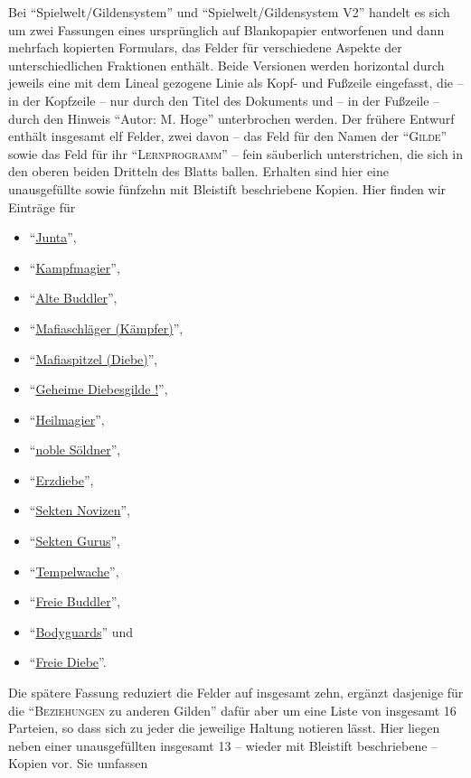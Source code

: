 \documentclass[a5paper,pagesize,numbers=noenddot]{scrbook}
\begin{document}
Bei \enquote{Spielwelt/Gildensystem} und \enquote{Spielwelt/Gildensystem V2} handelt es sich um zwei Fassungen eines ursprünglich auf Blankopapier entworfenen und dann mehrfach kopierten Formulars, das Felder für verschiedene Aspekte der unterschiedlichen Fraktionen enthält.
Beide Versionen werden horizontal durch jeweils eine mit dem Lineal gezogene Linie als Kopf- und Fußzeile eingefasst, die -- in der Kopfzeile -- nur durch den Titel des Dokuments und -- in der Fußzeile -- durch den Hinweis \enquote{Autor: M. Hoge} unterbrochen werden.
Der frühere Entwurf enthält insgesamt elf Felder, zwei davon -- das Feld für den Namen der \enquote{\textsc{Gilde}} sowie das Feld für ihr \enquote{\textsc{Lernprogramm}} -- fein säuberlich unterstrichen, die sich in den oberen beiden Dritteln des Blatts ballen.
Erhalten sind hier eine unausgefüllte sowie fünfzehn mit Bleistift beschriebene Kopien.
Hier finden wir Einträge für

\begin{itemize}
   \item \enquote{\uline{Junta}},
   \item \enquote{\uline{Kampfmagier}},
   \item \enquote{\uline{Alte Buddler}},
   \item \enquote{\uline{Mafiaschläger (Kämpfer)}},
   \item \enquote{\uline{Mafiaspitzel (Diebe)}},
   \item \enquote{\uline{Geheime Diebesgilde !}},
   \item \enquote{\uline{Heilmagier}},
   \item \enquote{\uline{noble Söldner}},
   \item \enquote{\uline{Erzdiebe}},
   \item \enquote{\uline{Sekten Novizen}},
   \item \enquote{\uline{Sekten Gurus}},
   \item \enquote{\uline{Tempelwache}},
   \item \enquote{\uline{Freie Buddler}},
   \item \enquote{\uline{Bodyguards}} und
   \item \enquote{\uline{Freie Diebe}}.
\end{itemize}

\noindent Die spätere Fassung reduziert die Felder auf insgesamt zehn, ergänzt dasjenige für die \enquote{\textsc{Beziehungen} zu anderen Gilden} dafür aber um eine Liste von insgesamt 16 Parteien, so dass sich zu jeder die jeweilige Haltung notieren lässt.
Hier liegen neben einer unausgefüllten insgesamt 13 -- wieder mit Bleistift beschriebene -- Kopien vor.
Sie umfassen
\end{document}
